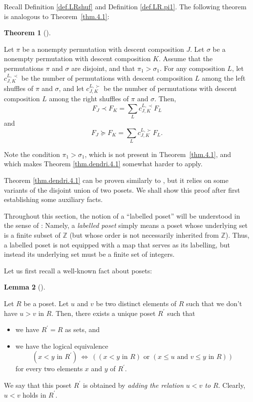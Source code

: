 \documentclass[numbers=enddot,12pt,final,onecolumn,notitlepage]{scrartcl}%
\theoremstyle{definition}
\newtheorem{theo}{Theorem}[section]
\newenvironment{theorem}[1][]
{\begin{theo}[#1]\begin{leftbar}}
{\end{leftbar}\end{theo}}
\newtheorem{lem}[theo]{Lemma}
\newenvironment{lemma}[1][]
{\begin{lem}[#1]\begin{leftbar}}
{\end{leftbar}\end{lem}}
\newenvironment{verlong}{}{}
\newcommand{\ZZ}{\mathbb{Z}}
\let\sumnonlimits\sum
\renewcommand{\sum}{\sumnonlimits\limits}
\begin{document}
\begin{verlong}
Recall Definition \ref{def.LRshuf} and Definition \ref{def.LR.pi1}. The
following theorem is analogous to Theorem~\ref{thm.4.1}:

\begin{theorem}
\label{thm.dendri.4.1}Let $\pi$ be a nonempty permutation with descent
composition $J$. Let $\sigma$ be a nonempty permutation with descent
composition $K$. Assume that the permutations $\pi$ and $\sigma$ are disjoint,
and that $\pi_{1}>\sigma_{1}$. For any composition $L$, let $c_{J,K}^{L,\prec
}$ be the number of permutations with descent composition $L$ among the left
shuffles of $\pi$ and $\sigma$, and let $c_{J,K}^{L,\succ}$ be the number of
permutations with descent composition $L$ among the right shuffles of $\pi$
and $\sigma$. Then,%
\[
F_{J}\left.  \prec\right.  F_{K}=\sum_{L}c_{J,K}^{L,\prec}F_{L}%
\]
and%
\[
F_{J}\left.  \succeq\right.  F_{K}=\sum_{L}c_{J,K}^{L,\succ}F_{L}.
\]

\end{theorem}

Note the condition $\pi_{1}>\sigma_{1}$, which is not present in
Theorem~\ref{thm.4.1}, and which makes Theorem \ref{thm.dendri.4.1} somewhat
harder to apply.

Theorem \ref{thm.dendri.4.1} can be proven similarly to
\cite[(5.2.6)]{HopfComb}, but it relies on some variants of the disjoint
union of two posets.
We shall show this proof after first establishing some auxiliary facts.

Throughout this section, the
notion of a ``labelled poset'' will be understood in the sense
of \cite[Definition 5.2.1]{HopfComb}:
Namely, a \textit{labelled poset} simply means a poset whose underlying
set is a finite subset of $\ZZ$ (but whose order is not necessarily
inherited from $\ZZ$).
Thus, a labelled poset is not equipped with a map that serves as its
labelling,
but instead its underlying set must be a finite set of integers.

Let us first recall a well-known fact about posets:

\begin{lemma}
\label{lem.poset.add-rel}
Let $R$ be a poset. Let $u$ and $v$ be two distinct elements of $R$
such that we don't have $u > v$ in $R$.
Then, there exists a unique poset $R^{\prime}$ such that
\begin{itemize}
\item we have $R^{\prime} = R$ as sets, and
\item
we have the logical equivalence
\[
\left(  x<y\text{ in }R^{\prime}\right)  \ \Longleftrightarrow\ \left(
\left(  x<y\text{ in }R\right)  \text{ or }\left(  x\leq u\text{ and }v\leq
y\text{ in }R\right)  \right)
\]
for every two elements $x$ and $y$ of $R^{\prime}$.
\end{itemize}
We say that this poset $R^{\prime}$ is obtained by
\textit{adding the relation $u < v$ to $R$}.
Clearly, $u < v$ holds in $R^{\prime}$.


\end{lemma}
\end{verlong}
\end{document}
